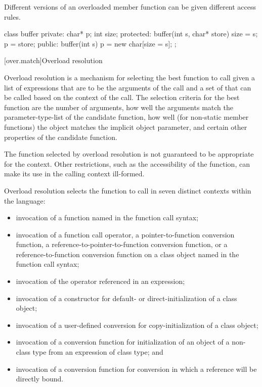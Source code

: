 \pnum
{}%
%
Different versions of an overloaded member function can be given different
access rules.
\begin{example}
\begin{codeblock}
class buffer {
private:
    char* p;
    int size;
protected:
    buffer(int s, char* store) { size = s; p = store; }
public:
    buffer(int s) { p = new char[size = s]; }
};
\end{codeblock}
\end{example}

[over.match]{Overload resolution}%
%
%

\pnum
Overload resolution is a mechanism for selecting the best
function to call given a list of expressions that are to be the
arguments of the call and a set of
that can
be called based on the context of the call.
The selection
criteria for the best function are the number of arguments, how
well the arguments match the parameter-type-list of the
candidate function,
how well (for non-static member functions) the object
matches the implicit object parameter,
and certain other properties of the candidate function.
\begin{note}
The function selected by overload resolution is not
guaranteed to be appropriate for the context.
Other restrictions,
such as the accessibility of the function, can make its use in
the calling context ill-formed.
\end{note}

\pnum
{}%
Overload resolution selects the function to call in seven distinct
contexts within the language:
\begin{itemize}
\item
invocation of a function named in the function call syntax;
\item
invocation of a function call operator, a pointer-to-function
conversion function, a reference-to-pointer-to-function conversion
function, or a reference-to-function
conversion function on a class object named in the function
call syntax;
\item
invocation of the operator referenced in an expression;
\item
invocation of a constructor for default- or direct-initialization
of a class object;
\item
invocation of a user-defined conversion for
copy-initialization of a class object;
\item
invocation of a conversion function for initialization of an object of a
non-class type from an expression of class type; and
\item
invocation of a conversion function for conversion
in which a reference
will be directly bound.
\end{itemize}

